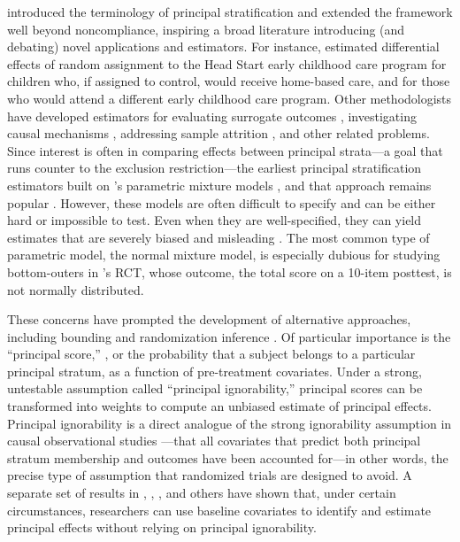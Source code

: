 \documentclass[]{article}
\begin{document}
\citet{frangakis} introduced the terminology of principal stratification and extended the framework well beyond noncompliance, inspiring a broad literature introducing (and debating) novel applications and estimators.
For instance, \citet{fellerEtAl2016} estimated differential effects of random assignment to the Head Start early childhood care program for children who, if assigned to control, would receive home-based care, and for those who would attend a different early childhood care program.
Other methodologists have developed estimators for evaluating surrogate outcomes \citep{li2010bayesian}, investigating causal mechanisms \citep{lidsayPage}, addressing sample attrition \citep{zhangRubin, ding2011}, and other related problems.
Since interest is often in comparing effects between principal strata---a goal that runs counter to the exclusion restriction---the earliest principal stratification estimators built on \citet{imbens1997bayesian}'s parametric mixture models \citep[e.g.][]{Barnard01062003,mealli2004analyzing}, and that approach remains popular \citep{lidsayPage,fellerEtAl2016}.
However, these models are often difficult to specify and can be either hard or impossible to test.
Even when they are well-specified, they can yield estimates that are severely biased and misleading \citep{griffin2008application,feller2016principal}.
The most common type of parametric model, the normal mixture model, is especially dubious for studying bottom-outers in \citet{impactPaper}'s RCT, whose outcome, the total score on a 10-item posttest, is not normally distributed.

These concerns have prompted the development of alternative approaches, including bounding \citep{bounding} and randomization inference \citep{nolen2011randomization}.
Of particular importance is the ``principal score,'' \citep{jo,dingLu,feller2017principal}, or the probability that a subject belongs to a particular principal stratum, as a function of pre-treatment covariates.
Under a strong, untestable assumption called ``principal ignorability,''  principal scores can be transformed into weights to compute an unbiased estimate of principal effects.
Principal ignorability is a direct analogue of the strong ignorability assumption in causal observational studies \citep[e.g.][]{rosenbaum1983central}---that all covariates that predict both principal stratum membership and outcomes have been accounted for---in other words, the precise type of assumption that randomized trials are designed to avoid.
A separate set of results in \citet{jo2002}, \citet{ding2011}, \citet{jiangDing2021}, and others have shown that, under certain circumstances, researchers can use baseline covariates to identify and estimate principal effects without relying on principal ignorability.
\end{document}
